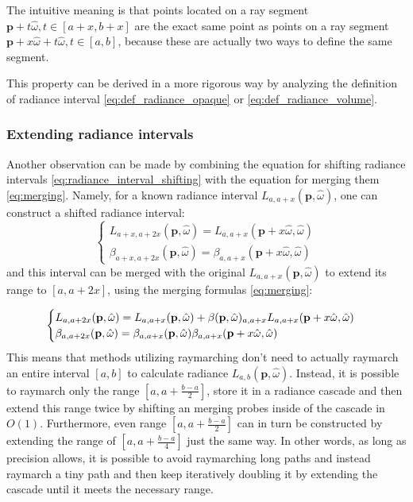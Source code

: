 \documentclass{jcgt}
\begin{document}
The intuitive meaning is that points located on a ray segment $\textbf{p} + t \hat \omega, t \in [a+x,b+x]$ are the exact same point as points on a ray segment $\textbf{p} + x \hat \omega + t \hat \omega, t \in [a,b]$, because these are actually two ways to define the same segment.

This property can be derived in a more rigorous way by analyzing the definition of radiance interval \ref{eq:def_radiance_opaque} or  \ref{eq:def_radiance_volume}.


\subsubsection{Extending radiance intervals}
Another observation can be made by combining the equation for shifting radiance intervals \ref{eq:radiance_interval_shifting} with the equation for merging them \ref{eq:merging}. Namely, for a known radiance interval $L_{a,a+x}(\textbf{p}, \hat \omega)$, one can construct a shifted radiance interval: 
\begin{equation}
  \begin{cases}
    L_{a+x,a+2x}(\textbf{p}, \hat \omega)
      =L_{a,a+x}(\textbf{p}+x\hat \omega, \hat \omega) \\
    \beta_{a+x,a+2x}(\textbf{p}, \hat \omega)
      =\beta_{a,a+x}(\textbf{p}+x\hat \omega, \hat \omega)
  \end{cases}
\end{equation}
and this interval can be merged with the original $L_{a,a+x}(\textbf{p}, \hat \omega)$ to extend its range to $[a,a+2x]$, using the merging formulas \ref{eq:merging}:

\begin{equation}
  \begin{cases}
    L_{a,a+2x}(\textbf{p}, \hat \omega) = L_{a,a+x}(\textbf{p}, \hat \omega) + \beta(\textbf p, \hat \omega)_{a, a+x}L_{a,a+x}(\textbf{p} + x\hat \omega, \hat \omega)\\
    \beta_{a, a+2x}(\textbf p, \hat \omega) = \beta_{a, a+x}(\textbf p, \hat \omega)\beta_{a, a+x}(\textbf p+x\hat \omega, \hat \omega)
    \label{eq:extending_intervals}
  \end{cases}
\end{equation}
This means that methods utilizing raymarching don't need to actually raymarch an entire interval $[a, b]$ to calculate radiance $L_{a,b}(\textbf{p}, \hat \omega)$. Instead, it is possible to raymarch only the range $[a, a + \frac{b-a}{2}]$, store it in a radiance cascade and then extend this range twice by shifting an merging probes inside of the cascade in $O(1)$. Furthermore, even range $[a, a+\frac{b-a}{2}]$ can in turn be constructed by extending the range of $[a, a+\frac{b-a}{4}]$ just the same way. In other words, as long as precision allows, it is possible to avoid raymarching long paths and instead raymarch a tiny path and then keep iteratively doubling it by extending the cascade until it meets the necessary range.
\end{document}
